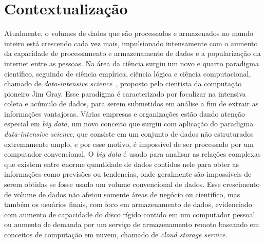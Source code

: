 
	\section{Contextualização}
	Atualmente, o volumes de dados que são processados e armazenados no mundo inteiro está crescendo cada vez mais, impulsionado intensamente com o aumento da capacidade de processamento e armazenamento de dados e a popularização da internet entre as pessoas. Na área da ciência surgiu um novo e quarto paradigma científico, seguindo de ciência empírica, ciência lógica e ciência computacional, chamado de \textit{data-intensive science}~\cite{hey2009}, proposto pelo cientista da computação pioneiro Jim Gray. Esse paradigma é caracterizado por focalizar na intensiva coleta e acúmulo de dados, para serem submetidos em análise a fim de extrair as informações vantajosas. Várias empresas e organizações estão dando atenção especial em \textit{big data}, um novo conceito que surgiu com aplicação do paradigma \textit{data-intensive science}, que consiste em um conjunto de dados não estruturados extremamente amplo, e por esse motivo, é impossível de ser processado por um computador convencional. O \textit{big data} é usado para analisar as relações complexas que existem entre enorme quantidade de dados contidos nele para obter as informações como previsões ou tendencias, onde geralmente são impossíveis de serem obtidas se fosse usado um volume convencional de dados. Esse crescimento de volume de dados não afetou somente áreas de negócio ou cientifico, mas também os usuários finais, com foco em armazenamento de dados, evidenciado com aumento de capacidade do disco rígido contido em um computador pessoal ou aumento de demanda por um serviço de armazenamento remoto baseando em conceitos de computação em nuvem, chamado de \textit{cloud storage service}.
	\\ 

	
